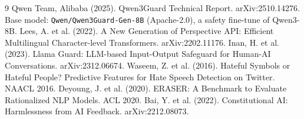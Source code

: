 \documentclass[11pt,a4paper]{article}
\begin{document}
\begin{thebibliography}{9}
 Qwen Team, Alibaba (2025). Qwen3Guard Technical Report. arXiv:2510.14276. Base model: \texttt{Qwen/Qwen3Guard-Gen-8B} (Apache-2.0), a safety fine-tune of Qwen3-8B.
 Lees, A. et al. (2022). A New Generation of Perspective API: Efficient Multilingual Character-level Transformers. arXiv:2202.11176.
 Inan, H. et al. (2023). Llama Guard: LLM-based Input-Output Safeguard for Human-AI Conversations. arXiv:2312.06674.
 Waseem, Z. et al. (2016). Hateful Symbols or Hateful People? Predictive Features for Hate Speech Detection on Twitter. NAACL 2016.
 Deyoung, J. et al. (2020). ERASER: A Benchmark to Evaluate Rationalized NLP Models. ACL 2020.
 Bai, Y. et al. (2022). Constitutional AI: Harmlessness from AI Feedback. arXiv:2212.08073.
\end{thebibliography}
\end{document}
